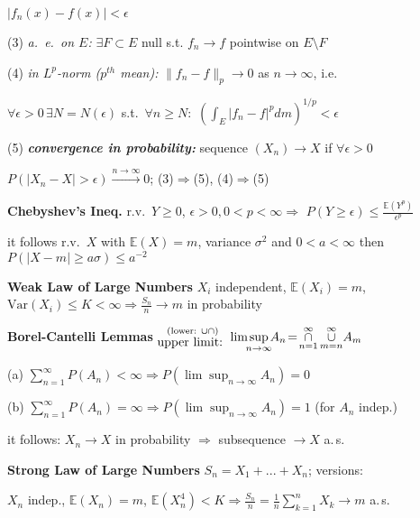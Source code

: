 \documentclass[8pt,twoside]{extarticle}
\begin{document}
\begin{multicols}{2}
\hspace{1.7em}$|f_n(x)-f(x)|<\epsilon$

(3) \textit{a.\ e.\ on $E$:} $\exists F\subset E$ null s.t. $f_n \to f$ pointwise on $E\setminus F$

(4) \textit{in $L^p$-norm ($p^{th}$ mean):} $\|f_n-f\|_p\to 0$ as $n\to \infty$, i.e.\

\hspace{1.7em}$\forall \epsilon{>}0\,\exists N{=}N(\epsilon)$ s.t.\ $\forall n\geq N:$ $\left(\int_E|f_n-f|^pdm\right)^{1/p} <\epsilon$


(5) \textit{\textbf{convergence in probability:}} sequence $(X_n)\to X$ if $\forall \epsilon{>}0$ 

\hspace{1.7em}$P(|X_n-X|>\epsilon)\overset{n\to\infty}{\to} 0$; (3)$\Rightarrow$(5), (4)$\Rightarrow$(5)

\textbf{Chebyshev's Ineq.} r.v.\ $Y{\geq} 0$, $\epsilon{>}0, 0{<}p{<}\infty \Rightarrow$  $P(Y{\geq} \epsilon)\leq \frac{\mathbb{E}(Y^p)}{\epsilon^p}$

it follows r.v.\ $X$ with $\mathbb{E}(X)=m$, variance $\sigma^2$ and $0<a<\infty$ then $P(|X-m|\geq a\sigma)\leq a^{-2}$

\textbf{Weak Law of Large Numbers} $X_i$ independent, $\mathbb{E}(X_i)=m$, $\mathrm{Var}(X_i)\leq K<\infty \Rightarrow \frac{S_n}{n} \to m$ in probability

\textbf{Borel-Cantelli Lemmas} 
$\substack{\text{(lower: } \cup\cap \text{)} \\ \text{\normalsize upper limit: }}\lim\!\! \sup\limits_{n\to\infty}\!\! A_n \!=\! \mathop{\cap}\limits_{n=1}^\infty\mathop{\cup}\limits_{m=n}^\infty\! A_m$ 

(a) $\sum_{n=1}^\infty P(A_n)<\infty \Rightarrow P(\lim \sup_{n\to\infty} A_n)=0$

(b) $\sum_{n=1}^\infty P(A_n)=\infty \Rightarrow P(\lim \sup_{n\to\infty} A_n)=1$ (for $A_n$ indep.)

it follows: $X_n\to X$ in probability $\Rightarrow$ subsequence $\to X$ a.\,s.\

\textbf{Strong Law of Large Numbers} $S_n=X_1+...+X_n$; versions:

\textbullet $X_n$ indep., $\mathbb{E}(X_n){=}m$, $\mathbb{E}(X^4_n){<} K \Rightarrow \frac{S_n}{n}{=}\frac{1}{n}\!\sum_{k=1}^n\!X_k\to m$ a.\,s.\



\end{multicols}
\end{document}
